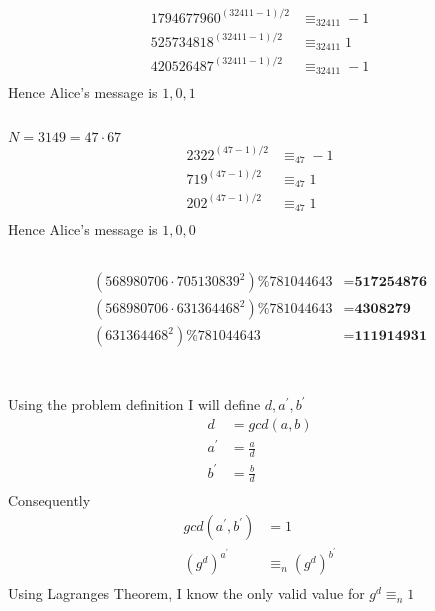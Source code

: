 \documentclass{article}
\begin{document}
\section{}
\subsection{}
\[
\begin{split}
1794677960^{(32411 - 1)/2} &\equiv_{32411} -1 \\
525734818^{(32411 - 1)/2} &\equiv_{32411} 1 \\
420526487^{(32411 - 1)/2} &\equiv_{32411} -1 \\
\end{split}
\]
Hence Alice's message is $1,0,1$
\subsection{}
$N = 3149 = 47 \cdot 67$
\[
\begin{split}
2322^{(47 - 1)/2} &\equiv_{47} -1\\
719^{(47 - 1)/2} &\equiv_{47} 1\\
202^{(47 - 1)/2} &\equiv_{47} 1\\
\end{split}
\]
Hence Alice's message is $1,0,0$
\subsection{}
\[
\begin{split}
(568980706 \cdot 705130839^{2}) \% 781044643 &= \textbf{517254876} \\
(568980706 \cdot 631364468^{2}) \% 781044643 &= \textbf{4308279} \\
(631364468^{2}) \% 781044643 &= \textbf{111914931} \\
\end{split}
\]
\section{}
Using the problem definition I will define $d, a^{\prime}, b^{\prime}$
\[
\begin{split}
d &= gcd(a, b) \\
a^{\prime} &= \frac{a}{d} \\ 
b^{\prime} &= \frac{b}{d} \\ 
\end{split}
\]
Consequently
\[
\begin{split}
gcd(a^{\prime}, b^{\prime}) &= 1 \\
(g^{d})^{a^{\prime}} &\equiv_{n} (g^{d})^{b^{\prime}} \\ 
\end{split}
\]
Using Lagranges Theorem, I know the only valid value for $g^{d} \equiv_{n} 1$
\end{document}
